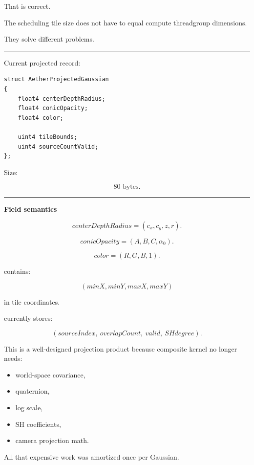 That is correct.

The scheduling tile size does not have to equal compute threadgroup dimensions.

They solve different problems.

\begin{center}\rule{0.5\linewidth}{0.5pt}\end{center}

Current projected record:

\protect{}\label{2lb4al}%
\begin{verbatim}
struct AetherProjectedGaussian
{
    float4 centerDepthRadius;
    float4 conicOpacity;
    float4 color;

    uint4 tileBounds;
    uint4 sourceCountValid;
};
\end{verbatim}

Size:

\[
\boxed{80\text{ bytes}.}
\]

\begin{center}\rule{0.5\linewidth}{0.5pt}\end{center}

\textbf{Field semantics}

\[
centerDepthRadius
=
(c_x,c_y,z,r).
\]

\[
conicOpacity
=
(A,B,C,\alpha_0).
\]

\[
color
=
(R,G,B,1).
\]

 contains:

\[
(minX,minY,maxX,maxY)
\]

in tile coordinates.

 currently stores:

\[
(sourceIndex,\ overlapCount,\ valid,\ SHdegree).
\]

This is a well-designed projection product because composite kernel no longer needs:

\begin{itemize}
\tightlist
\item
  world-space covariance,
\item
  quaternion,
\item
  log scale,
\item
  SH coefficients,
\item
  camera projection math.
\end{itemize}

All that expensive work was amortized once per Gaussian.

